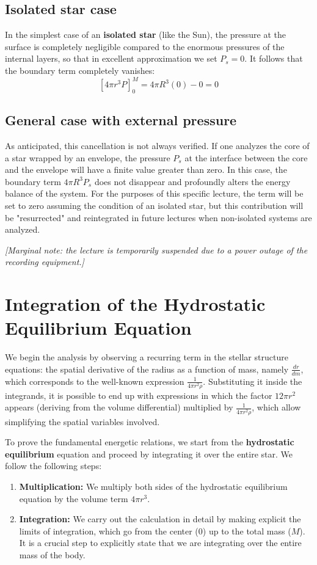 \subsection{Isolated star case}
In the simplest case of an \textbf{isolated star} (like the Sun), the pressure at the surface is completely negligible compared to the enormous pressures of the internal layers, so that in excellent approximation we set $P_s = 0$.
It follows that the boundary term completely vanishes:
\begin{equation}
\left[ 4\pi r^3 P \right]_0^M = 4\pi R^3 (0) - 0 = 0
\end{equation}

\subsection{General case with external pressure}
As anticipated, this cancellation is not always verified. If one analyzes the core of a star wrapped by an envelope, the pressure $P_s$ at the interface between the core and the envelope will have a finite value greater than zero.
In this case, the boundary term $4\pi R^3 P_s$ does not disappear and profoundly alters the energy balance of the system. For the purposes of this specific lecture, the term will be set to zero assuming the condition of an isolated star, but this contribution will be "resurrected" and reintegrated in future lectures when non-isolated systems are analyzed.

\vspace{1em}
\textit{[Marginal note: the lecture is temporarily suspended due to a power outage of the recording equipment.]}

\section{Integration of the Hydrostatic Equilibrium Equation}

We begin the analysis by observing a recurring term in the stellar structure equations: the spatial derivative of the radius as a function of mass, namely $\frac{dr}{dm}$, which corresponds to the well-known expression $\frac{1}{4\pi r^2 \rho}$.
Substituting it inside the integrands, it is possible to end up with expressions in which the factor $12\pi r^2$ appears (deriving from the volume differential) multiplied by $\frac{1}{4\pi r^2 \rho}$, which allow simplifying the spatial variables involved.

To prove the fundamental energetic relations, we start from the \textbf{hydrostatic equilibrium} equation and proceed by integrating it over the entire star. We follow the following steps:
\begin{enumerate}
\item \textbf{Multiplication:} We multiply both sides of the hydrostatic equilibrium equation by the volume term $4\pi r^3$.
\item \textbf{Integration:} We carry out the calculation in detail by making explicit the limits of integration, which go from the center ($0$) up to the total mass ($M$). It is a crucial step to explicitly state that we are integrating over the entire mass of the body.
\end{enumerate}

